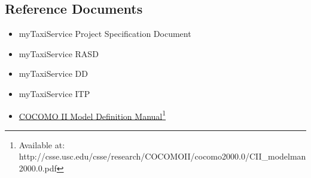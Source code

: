 \subsection{Reference Documents}
\begin{itemize}
	\item myTaxiService Project Specification Document
	\item myTaxiService RASD
	\item myTaxiService DD
	\item myTaxiService ITP
	\item \href{http://csse.usc.edu/csse/research/COCOMOII/cocomo2000.0/CII\_modelman2000.0.pdf}{COCOMO II Model Definition Manual}\footnote{Available at: http://csse.usc.edu/csse/research/COCOMOII/cocomo2000.0/CII\_modelman2000.0.pdf}
\end{itemize}